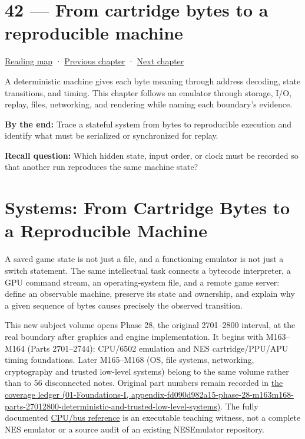 \hypertarget{06-engine-ii-ch042}{}
\chapter{42 --- From cartridge bytes to a reproducible machine}\label{06-engine-ii-ch042-from-cartridge-bytes-to-a-reproducible-machine}

\hyperref[volume-reading-map]{Reading map} · \hyperref[06-engine-ii-ch041-evidence-tools-and-revisable-design]{Previous chapter} · \hyperref[06-engine-ii-ch043-compiling-renderer-intent-into-backend-work]{Next chapter}

A deterministic machine gives each byte meaning through address decoding, state transitions, and timing. This chapter follows an emulator through storage, I/O, replay, files, networking, and rendering while naming each boundary's evidence.

\textbf{By the end:} Trace a stateful system from bytes to reproducible execution and identify what must be serialized or synchronized for replay.

\textbf{Recall question:} Which hidden state, input order, or clock must be recorded so that another run reproduces the same machine state?

\chapter{Systems: From Cartridge Bytes to a Reproducible Machine}\label{06-engine-ii-ch042-systems-from-cartridge-bytes-to-a-reproducible-machine}

A saved game state is not just a file, and a functioning emulator is not just a switch statement. The same intellectual task connects a bytecode interpreter, a GPU command stream, an operating-system file, and a remote game server: define an observable machine, preserve its state and ownership, and explain why a given sequence of bytes causes precisely the observed transition.

This new subject volume opens Phase 28, the original 2701--2800 interval, at the real boundary after graphics and engine implementation. It begins with M163--M164 (Parts 2701--2744): CPU/6502 emulation and NES cartridge/PPU/APU timing foundations. Later M165--M168 (OS, file systems, networking, cryptography and trusted low-level systems) belong to the same volume rather than to 56 disconnected notes. Original part numbers remain recorded in \href{../01-Foundations-I/main.pdf\#nameddest=appendix-fd090d982a15-phase-28-m163m168-parts-27012800-deterministic-and-trusted-low-level-systems}{the coverage ledger (01-Foundations-I, appendix-fd090d982a15-phase-28-m163m168-parts-27012800-deterministic-and-trusted-low-level-systems)}. The fully documented \hyperref[source-file-552a9e2296dc984412c8f06d]{CPU/bus reference} is an executable teaching witness, not a complete NES emulator or a source audit of an existing NESEmulator repository.

